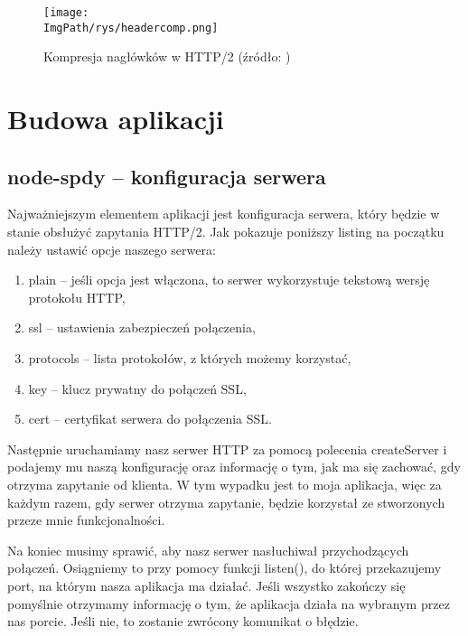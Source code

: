 \documentclass[a4paper,12pt,twoside,openany]{report}
\newcommand{\ImgPath}{.}
\begin{document}
\begin{figure}[!htbp]
	\begin{center}
\centering
\texttt{[image: \\ImgPath/rys/headercomp.png]}
\end{center}
	\caption{Kompresja nagłówków w HTTP/2 (źródło: \cite{http2Fundamentals})}
	\label{schematHeaderComp}
\end{figure}

\chapter{Budowa aplikacji}

\section{node-spdy -- konfiguracja serwera}

Najważniejszym elementem aplikacji jest konfiguracja serwera, który będzie w stanie obsłużyć zapytania HTTP/2.
Jak pokazuje poniższy listing na początku należy ustawić opcje naszego serwera:

\begin{enumerate}
	\item plain -- jeśli opcja jest włączona, to serwer wykorzystuje tekstową wersję protokołu HTTP, 
	\item ssl -- ustawienia zabezpieczeń połączenia,
	\item protocols -- lista protokołów, z których możemy korzystać,
	\item key -- klucz prywatny do połączeń SSL,
	\item cert -- certyfikat serwera do połączenia SSL.
\end{enumerate}

Następnie uruchamiamy nasz serwer HTTP za pomocą polecenia createServer i podajemy mu naszą konfigurację oraz informację o tym, jak ma się zachować, gdy otrzyma zapytanie od klienta.
W tym wypadku jest to moja aplikacja, więc za każdym razem, gdy serwer otrzyma zapytanie, będzie korzystał ze stworzonych przeze mnie funkcjonalności.

Na koniec musimy sprawić, aby nasz serwer nasłuchiwał przychodzących połączeń.
Osiągniemy to przy pomocy funkcji listen(), do której przekazujemy port, na którym nasza aplikacja ma działać.
Jeśli wszystko zakończy się pomyślnie otrzymamy informację o tym, że aplikacja działa na wybranym przez nas porcie.
Jeśli nie, to zostanie zwrócony komunikat o błędzie.
\end{document}
